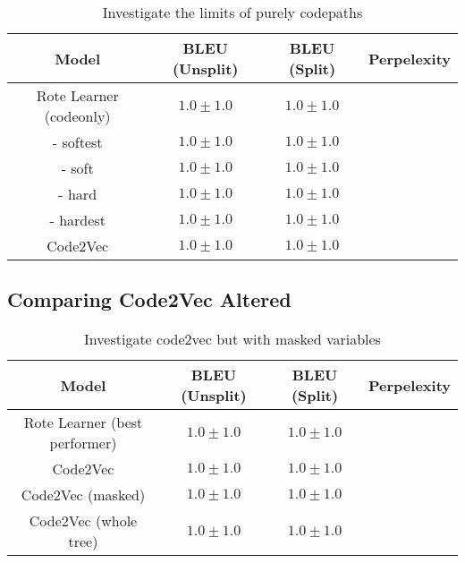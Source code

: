 \begin{table}[h!]
\begin{center}
\begin{tabular}{ c | c | c | c }
    Model                             & BLEU (Unsplit)  & BLEU (Split)    & Perpelexity \\
    \hline
    Rote Learner (codeonly)           & $1.0 \pm 1.0 $  & $1.0 \pm 1.0 $  & \\
    - softest                         & $1.0 \pm 1.0 $  & $1.0 \pm 1.0 $  & \\
    - soft                            & $1.0 \pm 1.0 $  & $1.0 \pm 1.0 $  & \\
    - hard                            & $1.0 \pm 1.0 $  & $1.0 \pm 1.0 $  & \\
    - hardest                         & $1.0 \pm 1.0 $  & $1.0 \pm 1.0 $  & \\
    \hline
    Code2Vec                          & $1.0 \pm 1.0 $  & $1.0 \pm 1.0 $  &  \\
    \hline
\end{tabular}
\caption {Investigate the limits of purely codepaths}
\label{table:name_code2vec_solo}
\end{center}
\end{table}


\subsection{Comparing Code2Vec Altered} %
\label{sub:comparing_code2vec_altered}


\begin{table}[h!]
\begin{center}
\begin{tabular}{ c | c | c | c }
    Model                             & BLEU (Unsplit)  & BLEU (Split)    & Perpelexity \\
    \hline
    Rote Learner (best performer)           & $1.0 \pm 1.0 $  & $1.0 \pm 1.0 $  & \\
    \hline
    Code2Vec                             & $1.0 \pm 1.0 $  & $1.0 \pm 1.0 $  &  \\
    Code2Vec (masked)                    & $1.0 \pm 1.0 $  & $1.0 \pm 1.0 $  &  \\
    Code2Vec (whole tree)                & $1.0 \pm 1.0 $  & $1.0 \pm 1.0 $  &  \\
    \hline
\end{tabular}
\caption {Investigate code2vec but with masked variables}
\label{table:code_2_vec_masked}
\end{center}
\end{table}


